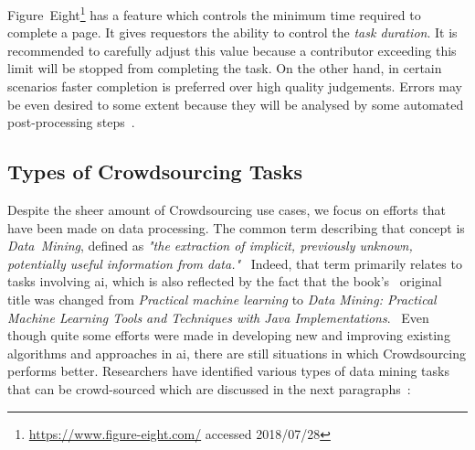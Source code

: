 Figure~Eight\footnote{\url{https://www.figure-eight.com/} accessed 2018/07/28} has a feature which controls the minimum time required to complete a page. It gives requestors the ability to control the \emph{task duration}. It is recommended to carefully adjust this value because a contributor exceeding this limit will be stopped from completing the task. On the other hand, in certain scenarios faster completion is preferred over high quality judgements. Errors may be even desired to some extent because they will be analysed by some automated post-processing steps~\cite{krishna2016}. 

\subsection{Types of Crowdsourcing Tasks}
Despite the sheer amount of Crowdsourcing use cases, we focus on efforts that have been made on data processing. The common term describing that concept is \emph{Data~Mining}, defined as \emph{"the extraction of implicit, previously unknown, potentially useful information from data."}~\cite{witten2016}
Indeed, that term primarily relates to tasks involving \gls{ai}, which is also reflected by the fact that the book's~\cite{witten2000} original title was changed from \emph{Practical machine learning} to \emph{Data Mining: Practical Machine Learning Tools and Techniques with Java Implementations}.~\cite{bouckaert2010} Even though quite some efforts were made in developing new and improving existing algorithms and approaches in \gls{ai}, there are still situations in which Crowdsourcing performs better. Researchers have identified various types of data mining tasks that can be crowd-sourced which are discussed in the next paragraphs~\cite{xintong2014, barbier2012, sabou2012}:


